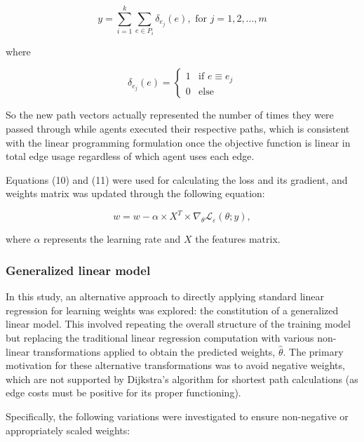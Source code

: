\[
y = \sum^k_{i=1}\sum_{e \in P_i}\delta_{e_j}(e), \text{  for  } j = 1,2,...,m \tag{13}
\]

where

\[
\delta_{e_j}(e) = 
\begin{cases}
    1 & \text{if } e \equiv e_j \\
    0 & \text{else}
\end{cases} \tag{14}
\]

So the new path vectors actually represented the number of times they were passed through while agents executed their respective paths, which is consistent with the linear programming formulation once the objective function is linear in total edge usage regardless of which agent uses each edge.

Equations (10) and (11) were used for calculating the loss and its gradient, and weights matrix was updated through the following equation:

\[
w = w - \alpha \times X^{T} \times \nabla_{\theta} \mathcal{L}_\varepsilon(\theta; y), \tag{15}
\]

where $\alpha$ represents the learning rate and $X$ the features matrix.

\subsubsection{Generalized linear model}

In this study, an alternative approach to directly applying standard linear regression for learning weights was explored: the constitution of a generalized linear model. This involved repeating the overall structure of the training model but replacing the traditional linear regression computation with various non-linear transformations applied to obtain the predicted weights, $\hat{\theta}$. The primary motivation for these alternative transformations was to avoid negative weights, which are not supported by Dijkstra's algorithm for shortest path calculations (as edge costs must be positive for its proper functioning).

Specifically, the following variations were investigated to ensure non-negative or appropriately scaled weights:

